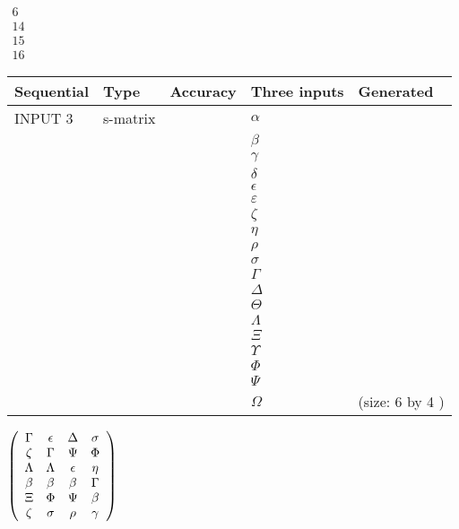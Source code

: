 \documentclass[12pt]{article}
\begin{document}
   
 $\begin{array}{
 c
 }
 6  \\ 
 14  \\ 
 15  \\ 
 16
\end{array}  $ 
  
  
\noindent\begin{tabular}{|l|l|l|l|l|}
\hline
 Sequential & Type & Accuracy & Three inputs & Generated \\ 
\hline
 
 
  INPUT $  3 $ & s-matrix & & 
 $  \alpha $ & 
  \\
  & & & 
 $  \beta $ & 
  \\
  & & & 
 $  \gamma $ & 
  \\
  & & & 
 $  \delta $ & 
  \\
  & & & 
 $  \epsilon $ & 
  \\
  & & & 
 $  \varepsilon $ & 
  \\
  & & & 
 $                     \zeta $ & 
  \\
  & & & 
 $  \eta $ & 
  \\
  & & & 
 $  \rho $ & 
  \\
  & & & 
 $  \sigma $ & 
  \\
  & & & 
 $  \Gamma $ & 
  \\
  & & & 
 $  \Delta $ & 
  \\
  & & & 
 $  \Theta $ & 
  \\
  & & & 
 $  \Lambda $ & 
  \\
  & & & 
 $                     \Xi $ & 
  \\
  & & & 
 $  \Upsilon $ & 
  \\
  & & & 
 $  \Phi $ & 
  \\
  & & & 
 $  \Psi $ & 
  \\
  & & & 
 $  \Omega $ & 
  (size:  6  by  4 )
 \\  \hline  
 \end{tabular}
   
   
 $  \left( \begin{array}
 {
 c
 c
 c
 c
 }
 \Gamma & 
 \epsilon & 
 \Delta & 
 \sigma \\ 
                    \zeta & 
 \Gamma & 
 \Psi & 
 \Phi \\ 
 \Lambda & 
 \Lambda & 
 \epsilon & 
 \eta \\ 
 \beta & 
 \beta & 
 \beta & 
 \Gamma \\ 
                    \Xi & 
 \Phi & 
 \Psi & 
 \beta \\ 
                    \zeta & 
 \sigma & 
 \rho & 
 \gamma
 \end{array} \right) $ 
  
\end{document}
